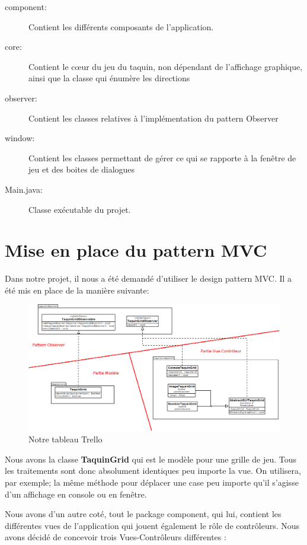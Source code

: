 		\begin{description}
			\item [component:] Contient les différents composants de l’application.
			\item [core:] Contient le cœur du jeu du taquin, non dépendant de l'affichage graphique, ainsi que la classe qui énumère les directions
			\item [observer:] Contient les classes relatives à l'implémentation du pattern Observer
			\item [window:] Contient les classes permettant de gérer ce qui se rapporte à la fenêtre de jeu et des boites de dialogues
			\item [Main.java:] Classe exécutable du projet.
		\end{description}

	\section{Mise en place du pattern MVC}

	Dans notre projet, il nous a été demandé d'utiliser le design pattern MVC. Il a été mis en place de la manière suivante:

	\begin{figure}[H]
		\centering\includegraphics[width=1\textwidth, keepaspectratio]{img/diagramMVC.png}
		\caption{Notre tableau Trello}
		\label{Mise en place du M-VC}
	\end{figure}

	Nous avons la classe \textbf{TaquinGrid} qui est le modèle pour une grille de jeu. Tous les traitements sont donc absolument identiques peu importe la vue. On utilisera, par exemple; la même méthode pour déplacer une case peu importe qu'il s'agisse d'un affichage en console ou en fenêtre.

	Nous avons d'un autre coté, tout le package component, qui lui, contient les différentes vues de l'application qui jouent également le rôle de contrôleurs. Nous avons décidé de concevoir trois Vues-Contrôleurs différentes :

